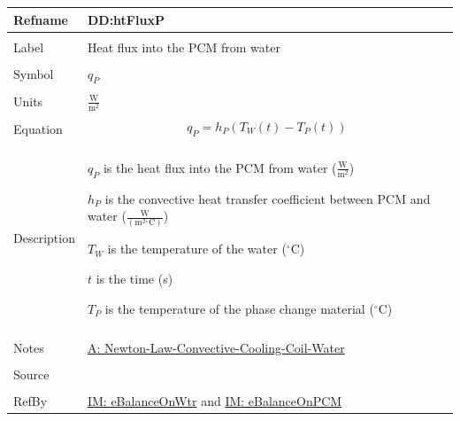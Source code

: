 \documentclass[12pt]{article}
\begin{document}
\noindent \begin{minipage}{\textwidth}
\begin{tabular}{>{\raggedright}p{}>{\raggedright\arraybackslash}p{}}
\toprule \textbf{Refname} & \textbf{DD:htFluxP}
\label{DD:htFluxP}
\\ \midrule \\
Label & Heat flux into the PCM from water
\\ \midrule \\
Symbol & ${q_{P}}$
\\ \midrule \\
Units & $\frac{\text{W}}{\text{m}^{2}}$
\\ \midrule \\
Equation & \begin{displaymath}
           {q_{P}}={h_{P}} \left({T_{W}}\left(t\right)-{T_{P}}\left(t\right)\right)
           \end{displaymath}
\\ \midrule \\
Description & \begin{symbDescription}
              \item{${q_{P}}$ is the heat flux into the PCM from water ($\frac{\text{W}}{\text{m}^{2}}$)}
              \item{${h_{P}}$ is the convective heat transfer coefficient between PCM and water ($\frac{\text{W}}{(\text{m}^{2}{}^{\circ}\text{C})}$)}
              \item{${T_{W}}$ is the temperature of the water (${}^{\circ}$C)}
              \item{$t$ is the time (s)}
              \item{${T_{P}}$ is the temperature of the phase change material (${}^{\circ}$C)}
              \end{symbDescription}
\\ \midrule \\
Notes & \hyperref[assumpLCCCW]{A: Newton-Law-Convective-Cooling-Coil-Water}
\\ \midrule \\
Source & \cite{koothoor2013}
\\ \midrule \\
RefBy & \hyperref[IM:eBalanceOnWtr]{IM: eBalanceOnWtr} and \hyperref[IM:eBalanceOnPCM]{IM: eBalanceOnPCM}
\\ \bottomrule
\end{tabular}
\end{minipage}
\par~
\end{document}

